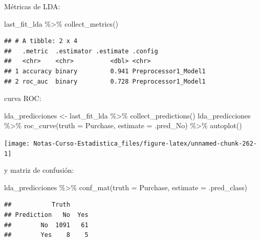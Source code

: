 \documentclass[
  12pt,
]{book}
\newenvironment{Shaded}{\begin{snugshade}}{\end{snugshade}}
\newcommand{\AttributeTok}[1]{\textcolor[rgb]{0.77,0.63,0.00}{#1}}
\newcommand{\FunctionTok}[1]{\textcolor[rgb]{0.00,0.00,0.00}{#1}}
\newcommand{\NormalTok}[1]{#1}
\newcommand{\OtherTok}[1]{\textcolor[rgb]{0.56,0.35,0.01}{#1}}
\newcommand{\SpecialCharTok}[1]{\textcolor[rgb]{0.00,0.00,0.00}{#1}}
\theoremstyle{definition}
\theoremstyle{definition}
\theoremstyle{definition}
\theoremstyle{definition}
\theoremstyle{remark}
\begin{document}
Métricas de LDA:

\begin{Shaded}
\begin{Highlighting}[]
\NormalTok{last\_fit\_lda }\SpecialCharTok{\%\textgreater{}\%}
    \FunctionTok{collect\_metrics}\NormalTok{()}
\end{Highlighting}
\end{Shaded}

\begin{verbatim}
## # A tibble: 2 x 4
##   .metric  .estimator .estimate .config             
##   <chr>    <chr>          <dbl> <chr>               
## 1 accuracy binary         0.941 Preprocessor1_Model1
## 2 roc_auc  binary         0.728 Preprocessor1_Model1
\end{verbatim}

curva ROC:

\begin{Shaded}
\begin{Highlighting}[]
\NormalTok{lda\_predicciones }\OtherTok{\textless{}{-}}\NormalTok{ last\_fit\_lda }\SpecialCharTok{\%\textgreater{}\%}
    \FunctionTok{collect\_predictions}\NormalTok{()}
\NormalTok{lda\_predicciones }\SpecialCharTok{\%\textgreater{}\%}
    \FunctionTok{roc\_curve}\NormalTok{(}\AttributeTok{truth =}\NormalTok{ Purchase, }\AttributeTok{estimate =}\NormalTok{ .pred\_No) }\SpecialCharTok{\%\textgreater{}\%}
    \FunctionTok{autoplot}\NormalTok{()}
\end{Highlighting}
\end{Shaded}

\begin{center}\texttt{[image: Notas-Curso-Estadistica\_files/figure-latex/unnamed-chunk-262-1]} \end{center}

y matriz de confusión:

\begin{Shaded}
\begin{Highlighting}[]
\NormalTok{lda\_predicciones }\SpecialCharTok{\%\textgreater{}\%}
    \FunctionTok{conf\_mat}\NormalTok{(}\AttributeTok{truth =}\NormalTok{ Purchase, }\AttributeTok{estimate =}\NormalTok{ .pred\_class)}
\end{Highlighting}
\end{Shaded}

\begin{verbatim}
##           Truth
## Prediction   No  Yes
##        No  1091   61
##        Yes    8    5
\end{verbatim}
\end{document}
